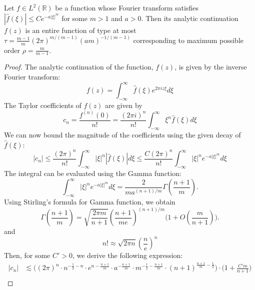 \documentclass[graybox]{svmult}
\begin{document}
\begin{lemma}\label{OrderType}
Let $f \in L^2(\mathbb{R})$ be a function whose Fourier transform satisfies $|\hat{f}(\xi)| \le C e^{-a|\xi|^m}$ for some $m>1$ and $a>0$. Then its analytic continuation $f(z)$ is an entire function of type at most $\tau = \frac{m-1}{m}(2\pi)^{m/(m-1)}(am)^{-1/(m-1)}$ corresponding to maximum possible order $\rho = \frac{m}{m-1}$.
\end{lemma}
\begin{proof}
The analytic continuation of the function, $f(z)$, is given by the inverse Fourier transform:
\begin{equation*}
    f(z) = \int_{-\infty}^\infty \hat{f}(\xi) e^{2\pi i z \xi} d\xi
\end{equation*}
The Taylor coefficients of $f(z)$ are given by 
\begin{equation*}
c_n = \frac{f^{(n)}(0)}{n!} = \frac{(2\pi i)^n}{n!} \int_{-\infty}^\infty \xi^n \hat{f}(\xi) d\xi
\end{equation*}
We can now bound the magnitude of the coefficients using the given decay of $\hat{f}(\xi)$:
\begin{equation*}
|c_n| \le \frac{(2\pi)^n}{n!} \int_{-\infty}^\infty |\xi|^n |\hat{f}(\xi)| d\xi \le \frac{C(2\pi)^n}{n!} \int_{-\infty}^\infty |\xi|^n e^{-a|\xi|^m} d\xi
\end{equation*}
The integral can be evaluated using the Gamma function:
\begin{equation*}
    \int_{-\infty}^\infty |\xi|^n e^{-a|\xi|^m} d\xi = \frac{2}{m a^{(n+1)/m}} \Gamma\left(\frac{n+1}{m}\right). 
\end{equation*}
Using Stirling's formula for Gamma function, we obtain 
\begin{equation*}
 \Gamma(\frac{n+1}{m}) = \sqrt{\frac{2 \pi m}{n+1}}(\frac{n+1}{me})^{(n+1)/m}\big(1+ O(\frac{m}{n+1})\big).
\end{equation*}
and 
\begin{equation*}
    n! \approx \sqrt{2 \pi n}(\frac{n}{e})^n
\end{equation*}
Then, for some $C' >0$, we derive the following expression:
         \begin{align}\label{GeneralTaylorCoefficient}
              |c_n|
             &\lesssim \Big((2\pi)^n \cdot n^{-\frac{1}{2}-n}\cdot e^{n -\frac{n+1}{m}}\cdot a^{-\frac{n+1}{m}}\cdot m ^{-\frac{1}{2}-\frac{n+1}{m}}\cdot (n+1)^{\frac{n+1}{m}-\frac{1}{2}}\Big)\cdot\Big(1 + \frac{C'm}{n+1}\Big) \\

\end{align}
\end{proof}
\end{document}
